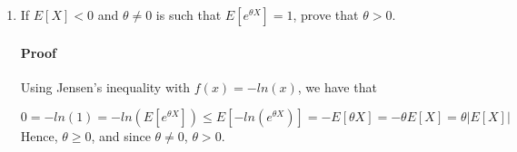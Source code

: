 \documentclass[letterpaper,12pt]{article}
\theoremstyle{definition}
\begin{document}
\begin{enumerate}
\begin{itemize}
		\end{itemize}

	\item If $E[X]<0$ and $\theta \neq 0$ is such that $E[e^{\theta X}]=1$, prove that $\theta > 0$.
    \paragraph{Proof} Using Jensen's inequality with $f(x) = -ln(x)$, we have that
    
    $0 = -ln(1) = -ln(E[e^{\theta X}]) \le E[-ln(e^{\theta X})] = -E[\theta X] = -\theta E[X] = \theta \vert E[X]\vert $ Hence, $\theta \ge 0$, and since $\theta \neq 0$,  $\theta > 0$.
\end{enumerate}


\vspace{25mm}


\end{document}
